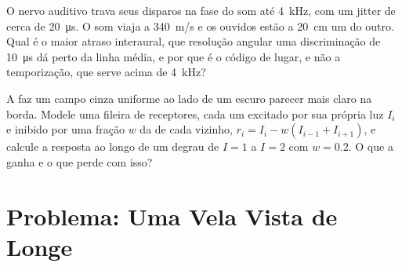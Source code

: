 \begin{exercise}[$\star\star\star$]\label{exo:b3:sensory-systems:11}
O nervo auditivo trava seus disparos na fase do som até \qty{4}{kHz},
com um jitter de cerca de \qty{20}{\micro s}. O som viaja a
\qty{340}{m/s} e os ouvidos estão a \qty{20}{cm} um do outro. Qual é o
maior atraso interaural, que resolução angular uma discriminação de
\qty{10}{\micro s} dá perto da linha média, e por que é o código de
lugar, e não a temporização, que serve acima de \qty{4}{kHz}?
\end{exercise}

\begin{exercise}[$\star\star\star$]\label{exo:b3:sensory-systems:12}
A  faz um campo cinza uniforme ao lado de um escuro
parecer mais claro na borda. Modele uma fileira de receptores, cada um
excitado por sua própria luz $I_{i}$ e inibido por uma fração $w$ da de
cada vizinho, $r_{i} = I_{i} - w(I_{i-1} + I_{i+1})$, e calcule a
resposta ao longo de um degrau de $I = 1$ a $I = 2$ com $w = 0.2$. O que
a  ganha e o que perde com isso?
\end{exercise}

\section{Problema: Uma Vela Vista de Longe}


